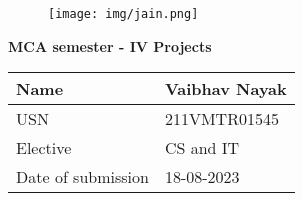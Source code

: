 \documentclass{article}
\begin{document}
\begin{figure}[t]
    \centering
    \texttt{[image: img/jain.png]}
\end{figure}
\vspace{40pt}

\begin{center}
    \Large\bfseries MCA semester - IV Projects
\end{center}

\vspace{40pt}
\begin{center}
    \renewcommand{\arraystretch}{1.5}
    \begin{tabularx}{\textwidth}{|X|X|} %
         \hline %
        Name & Vaibhav Nayak \\ %
        \hline
        USN & 211VMTR01545 \\
        \hline
        Elective &  CS and IT\\
        \hline
        Date of submission& 18-08-2023 \\
        \hline
    \end{tabularx}

\end{center}

\newpage




\vspace*{0.2cm}
\end{document}
